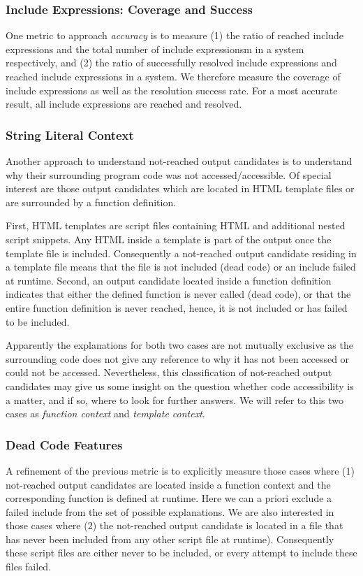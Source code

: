 \documentclass[preprint]{sig-alternate-05-2015}
\begin{document}
\subsubsection{Include Expressions: Coverage and Success} \label{include_coverage_section}
One metric to approach \emph{accuracy} is to measure (1) the ratio of reached
include expressions and the total number of include expressionsm in a system
respectively, and (2) the ratio of successfully resolved include expressions and
reached include expressions in a system. We therefore measure the coverage
of include expressions as well as the resolution success rate. For a most
accurate result, all include expressions are reached and resolved.

\subsubsection{String Literal Context} \label{context_section}
Another approach to understand not-reached output candidates is to understand why their surrounding program code was not accessed/accessible. Of special interest are those output candidates which are located in HTML template files or are surrounded by a function definition. 

First, HTML templates are script files containing HTML and additional nested script snippets. Any HTML inside a template is part of the output once the template file is included. Consequently a not-reached output candidate residing in a template file means that the file is not included (dead code) or an include failed at runtime. Second, an output candidate located inside a function definition indicates that either the defined function is never called (dead code), or that the entire function definition is never reached, hence, it is not included or has failed to be included.

Apparently the explanations for both two cases are not mutually exclusive as the surrounding code does not give any reference to why it has not been accessed or could not be accessed. Nevertheless, this classification of not-reached output candidates may give us some insight on the question whether code accessibility is a matter, and if so, where to look for further answers. We will refer to this two cases as \emph{function context} and \emph{template context}.

\subsubsection{Dead Code Features} \label{dead_feature_section}
A refinement of the previous metric is to explicitly measure those cases where (1) not-reached output candidates are located inside a function context and the corresponding function is defined at runtime. Here we can a priori exclude a failed include from the set of possible explanations. We are also interested in those cases where (2) the not-reached output candidate is located in a file that has never been included from any other script file at runtime). Consequently these script files are either never to be included, or every attempt to include these files failed.
\end{document}
